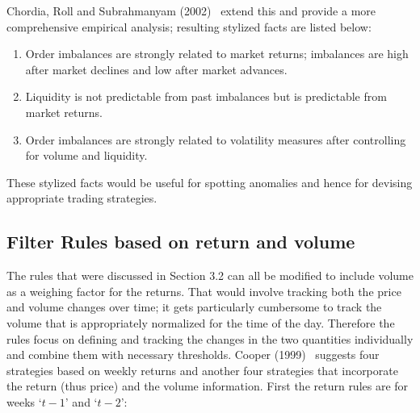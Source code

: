 Chordia, Roll and Subrahmanyam (2002)~\cite{chorroll} extend this and provide a more comprehensive empirical analysis; resulting stylized facts are listed below:
	\begin{enumerate}[--]
	\item Order imbalances are strongly related to market returns; imbalances are high after market declines and low after market advances.
	\item Liquidity is not predictable from past imbalances but is predictable from market returns.
	\item Order imbalances are strongly related to volatility measures after controlling for volume and liquidity. 
	\end{enumerate}
These stylized facts would be useful for spotting anomalies and hence for devising appropriate trading strategies. 


\subsection{Filter Rules based on return and volume}


The rules that were discussed in Section 3.2 can all be modified to include volume as a weighing factor for the returns. That would involve tracking both the price and volume changes over time; it gets particularly cumbersome to track the volume that is appropriately normalized for the time of the day. Therefore the rules focus on defining and tracking the changes in the two quantities individually and combine them with necessary thresholds. Cooper (1999)~\cite{cooper} suggests four strategies based on weekly returns and another four strategies that incorporate the return (thus price) and the volume information. First the return rules are for weeks `$t-1$' and `$t-2$': \\

